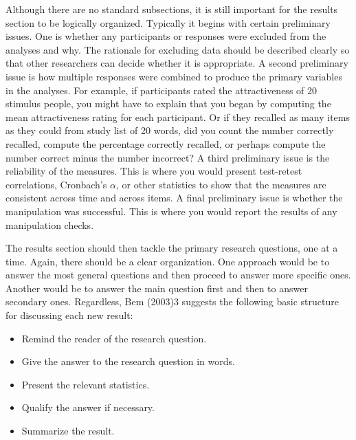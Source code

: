 Although there are no standard subsections, it is still important for the results section to be logically organized. Typically it begins with certain preliminary issues. One is whether any participants or responses were excluded from the analyses and why. The rationale for excluding data should be described clearly so that other researchers can decide whether it is appropriate. A second preliminary issue is how multiple responses were combined to produce the primary variables in the analyses. For example, if participants rated the attractiveness of 20 stimulus people, you might have to explain that you began by computing the mean attractiveness rating for each participant. Or if they recalled as many items as they could from study list of 20 words, did you count the number correctly recalled, compute the percentage correctly recalled, or perhaps compute the number correct minus the number incorrect? A third preliminary issue is the reliability of the measures. This is where you would present test-retest correlations, Cronbach's $\alpha$, or other statistics to show that the measures are consistent across time and across items. A final preliminary issue is whether the manipulation was successful. This is where you would report the results of any manipulation checks.




The results section should then tackle the primary research questions, one at a time. Again, there should be a clear organization. One approach would be to answer the most general questions and then proceed to answer more specific ones. Another would be to answer the main question first and then to answer secondary ones. Regardless, Bem (2003)3 suggests the following basic structure for discussing each new result:



\begin{itemize}

\item Remind the reader of the research question.


\item Give the answer to the research question in words.


\item Present the relevant statistics.


\item Qualify the answer if necessary.


\item Summarize the result.

\end{itemize}



